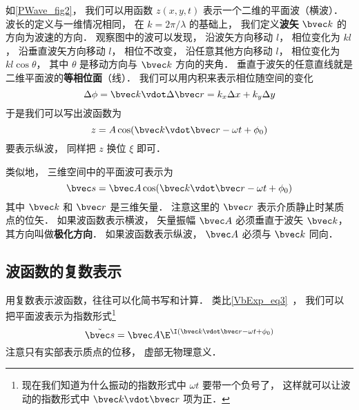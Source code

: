 如\autoref{PWave_fig2}， 我们可以用函数 $z(x,y,t)$ 表示一个二维的平面波（横波）． 波长的定义与一维情况相同， 在 $k = 2\pi/\lambda$ 的基础上， 我们定义\textbf{波矢} $\bvec k$ 的方向为波速的方向．
观察图中的波可以发现， 沿波矢方向移动 $l$， 相位变化为 $kl$， 沿垂直波矢方向移动 $l$， 相位不改变， 沿任意其他方向移动 $l$， 相位变化为 $kl\cos\theta$， 其中 $\theta$ 是移动方向与 $\bvec k$ 方向的夹角． 垂直于波矢的任意直线就是二维平面波的\textbf{等相位面}（线）． 我们可以用内积来表示相位随空间的变化
\begin{equation}
\Delta\phi = \bvec k \vdot \Delta\bvec r = k_x \Delta x + k_y \Delta y
\end{equation}
于是我们可以写出波函数为
\begin{equation}\label{PWave_eq8}
z = A \cos(\bvec k \vdot \bvec r - \omega t + \phi_0)
\end{equation}
要表示纵波， 同样把 $z$ 换位 $\xi$ 即可．

类似地， 三维空间中的平面波可表示为
\begin{equation}
\bvec s = \bvec A \cos(\bvec k \vdot \bvec r - \omega t + \phi_0)
\end{equation}
其中 $\bvec k$ 和 $\bvec r$ 是三维矢量． 注意这里的 $\bvec r$ 表示介质静止时某质点的位矢． 如果波函数表示横波， 矢量振幅 $\bvec A$ 必须垂直于波矢 $\bvec k$， 其方向叫做\textbf{极化方向}． 如果波函数表示纵波， $\bvec A$ 必须与 $\bvec k$ 同向．

\subsection{波函数的复数表示}

用复数表示波函数，往往可以化简书写和计算． 类比\autoref{VbExp_eq3}~， 我们可以把平面波表示为指数形式\footnote{现在我们知道为什么振动的指数形式中 $\omega t$ 要带一个负号了， 这样就可以让波动的指数形式中 $\bvec k\vdot \bvec r$ 项为正．}
\begin{equation}
\tilde {\bvec s} = \bvec A \E^{\I( \bvec k \vdot \bvec r - \omega t + \phi_0)}
\end{equation}
注意只有实部表示质点的位移， 虚部无物理意义．

